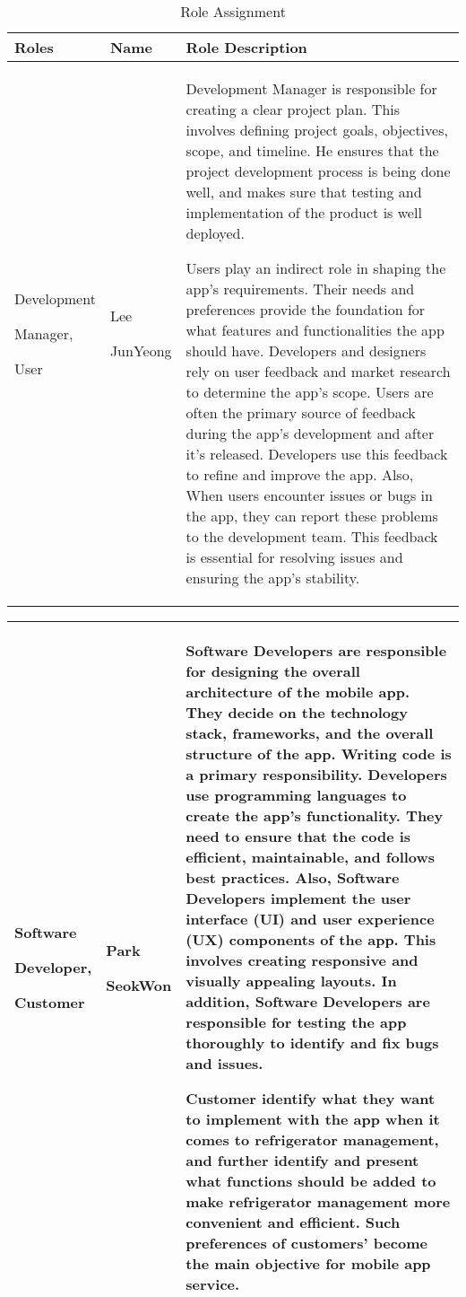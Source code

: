 \documentclass[conference]{IEEEtran}
\begin{document}
\begin{table}[h]
\caption{Role Assignment}
\begin{tabular}{| p{1.7cm}|p{1.5cm}|p{4.3cm} |}

\hline
Roles & Name & Role Description\\
\hline
Development \par Manager, \par User 
& Lee \par JunYeong 
& Development Manager is responsible for creating a clear project plan. This involves defining project goals, objectives, scope, and timeline. He ensures that the project development process is being done well, and makes sure that testing and implementation of the product is well deployed. \par
Users play an indirect role in shaping the app's requirements. Their needs and preferences provide the foundation for what features and functionalities the app should have. Developers and designers rely on user feedback and market research to determine the app's scope. Users are often the primary source of feedback during the app's development and after it's released. Developers use this feedback to refine and improve the app. Also, When users encounter issues or bugs in the app, they can report these problems to the development team. This feedback is essential for resolving issues and ensuring the app's stability.\\
\hline
\end{tabular}
\end{table}
\begin{table}[h]
\begin{tabular}{| p{1.7cm}|p{1.5cm}|p{4.3cm} |}
\hline
Software  \par Developer,  \par Customer 
& Park \par SeokWon 
& Software	 Developers are responsible for designing the overall architecture of the mobile app. They decide on the technology stack, frameworks, and the overall structure of the app.
Writing code is a primary responsibility. Developers use programming languages to create the app's functionality. They need to ensure that the code is efficient, maintainable, and follows best practices. Also, Software Developers implement the user interface (UI) and user experience (UX) components of the app. This involves creating responsive and visually appealing layouts. In addition, Software Developers are responsible for testing the app thoroughly to identify and fix bugs and issues.
\par Customer identify what they want to implement with the app when it comes to refrigerator management, and further identify and present what functions should be added to make refrigerator management more convenient and efficient. Such preferences of customers’ become the main objective for mobile app service. \\
\hline

\end{tabular}
\end{table}
\end{document}
